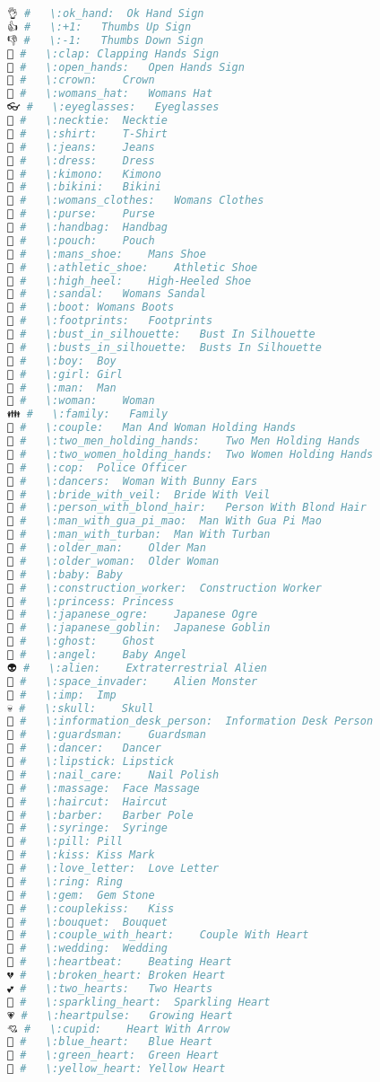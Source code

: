 \begin{lstlisting}[language=Julia]
👌 #   \:ok_hand:  Ok Hand Sign
👍 #   \:+1:   Thumbs Up Sign
👎 #   \:-1:   Thumbs Down Sign
👏 #   \:clap: Clapping Hands Sign
👐 #   \:open_hands:   Open Hands Sign
👑 #   \:crown:    Crown
👒 #   \:womans_hat:   Womans Hat
👓 #   \:eyeglasses:   Eyeglasses
👔 #   \:necktie:  Necktie
👕 #   \:shirt:    T-Shirt
👖 #   \:jeans:    Jeans
👗 #   \:dress:    Dress
👘 #   \:kimono:   Kimono
👙 #   \:bikini:   Bikini
👚 #   \:womans_clothes:   Womans Clothes
👛 #   \:purse:    Purse
👜 #   \:handbag:  Handbag
👝 #   \:pouch:    Pouch
👞 #   \:mans_shoe:    Mans Shoe
👟 #   \:athletic_shoe:    Athletic Shoe
👠 #   \:high_heel:    High-Heeled Shoe
👡 #   \:sandal:   Womans Sandal
👢 #   \:boot: Womans Boots
👣 #   \:footprints:   Footprints
👤 #   \:bust_in_silhouette:   Bust In Silhouette
👥 #   \:busts_in_silhouette:  Busts In Silhouette
👦 #   \:boy:  Boy
👧 #   \:girl: Girl
👨 #   \:man:  Man
👩 #   \:woman:    Woman
👪 #   \:family:   Family
👫 #   \:couple:   Man And Woman Holding Hands
👬 #   \:two_men_holding_hands:    Two Men Holding Hands
👭 #   \:two_women_holding_hands:  Two Women Holding Hands
👮 #   \:cop:  Police Officer
👯 #   \:dancers:  Woman With Bunny Ears
👰 #   \:bride_with_veil:  Bride With Veil
👱 #   \:person_with_blond_hair:   Person With Blond Hair
👲 #   \:man_with_gua_pi_mao:  Man With Gua Pi Mao
👳 #   \:man_with_turban:  Man With Turban
👴 #   \:older_man:    Older Man
👵 #   \:older_woman:  Older Woman
👶 #   \:baby: Baby
👷 #   \:construction_worker:  Construction Worker
👸 #   \:princess: Princess
👹 #   \:japanese_ogre:    Japanese Ogre
👺 #   \:japanese_goblin:  Japanese Goblin
👻 #   \:ghost:    Ghost
👼 #   \:angel:    Baby Angel
👽 #   \:alien:    Extraterrestrial Alien
👾 #   \:space_invader:    Alien Monster
👿 #   \:imp:  Imp
💀 #   \:skull:    Skull
💁 #   \:information_desk_person:  Information Desk Person
💂 #   \:guardsman:    Guardsman
💃 #   \:dancer:   Dancer
💄 #   \:lipstick: Lipstick
💅 #   \:nail_care:    Nail Polish
💆 #   \:massage:  Face Massage
💇 #   \:haircut:  Haircut
💈 #   \:barber:   Barber Pole
💉 #   \:syringe:  Syringe
💊 #   \:pill: Pill
💋 #   \:kiss: Kiss Mark
💌 #   \:love_letter:  Love Letter
💍 #   \:ring: Ring
💎 #   \:gem:  Gem Stone
💏 #   \:couplekiss:   Kiss
💐 #   \:bouquet:  Bouquet
💑 #   \:couple_with_heart:    Couple With Heart
💒 #   \:wedding:  Wedding
💓 #   \:heartbeat:    Beating Heart
💔 #   \:broken_heart: Broken Heart
💕 #   \:two_hearts:   Two Hearts
💖 #   \:sparkling_heart:  Sparkling Heart
💗 #   \:heartpulse:   Growing Heart
💘 #   \:cupid:    Heart With Arrow
💙 #   \:blue_heart:   Blue Heart
💚 #   \:green_heart:  Green Heart
💛 #   \:yellow_heart: Yellow Heart

\end{lstlisting}
